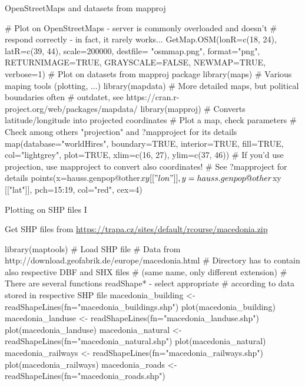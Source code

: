 \documentclass[compress, ucs, xelatex, 11pt, xcolor=svgnames,
  hyperref={
    bookmarks=true,
    unicode=true,
    colorlinks=true,
    pdftitle={Molecular data in R},
    plainpages=false,
    pdfauthor={Vojtech Zeisek},
    pdfsubject={Course about phylogeny and evolution in R},
    pdfcreator={XeLaTeX},
    pdfkeywords={R, evolution, phylogeny, molecular data},
    linkcolor=Tomato,
    anchorcolor=SaddleBrown,
    citecolor=Goldenrod,
    filecolor=DarkMagenta,
    menucolor=Sienna,
    urlcolor=DarkTurquoise,
    pdftex},
  url={hyphens, lowtilde} %
  ]{beamer}
\begin{document}
\begin{frame}[fragile]{OpenStreetMaps and datasets from mapproj}
  \begin{spluscode}
    # Plot on OpenStreetMaps - server is commonly overloaded and doesn't
    # respond correctly - in fact, it rarely works...
    GetMap.OSM(lonR=c(18, 24), latR=c(39, 44), scale=200000, destfile=
      "osmmap.png", format="png", RETURNIMAGE=TRUE, GRAYSCALE=FALSE,
      NEWMAP=TRUE, verbose=1)
    # Plot on datasets from mapproj package
    library(maps) # Various maping tools (plotting, ...)
    library(mapdata) # More detailed maps, but political boundaries often
          # outdatet, see https://cran.r-project.org/web/packages/mapdata/
    library(mapproj) # Converts latitude/longitude into projected coordinates
    # Plot a map, check parameters
    # Check among others "projection" and ?mapproject for its details
    map(database="worldHires", boundary=TRUE, interior=TRUE, fill=TRUE,
      col="lightgrey", plot=TRUE, xlim=c(16, 27), ylim=c(37, 46))
    # If you'd use projection, use mapproject to convert also coordinates!
    # See ?mapproject for details
    points(x=hauss.genpop@other$xy[["lon"]], y=hauss.genpop@other$xy
      [["lat"]], pch=15:19, col="red", cex=4)
  \end{spluscode}
\end{frame}

\begin{frame}[fragile]{Plotting on SHP files I}
\begin{scriptsize}
  Get SHP files from \url{https://trapa.cz/sites/default/rcourse/macedonia.zip}
\end{scriptsize}
  \begin{spluscode}
    library(maptools)
    # Load SHP file
    # Data from http://download.geofabrik.de/europe/macedonia.html
    # Directory has to contain also respective DBF and SHX files
    # (same name, only different extension)
    # There are several functions readShape* - select appropriate
    # according to data stored in respective SHP file
    macedonia_building <- readShapeLines(fn="macedonia_buildings.shp")
    plot(macedonia_building)
    macedonia_landuse <- readShapeLines(fn="macedonia_landuse.shp")
    plot(macedonia_landuse)
    macedonia_natural <- readShapeLines(fn="macedonia_natural.shp")
    plot(macedonia_natural)
    macedonia_railways <- readShapeLines(fn="macedonia_railways.shp")
    plot(macedonia_railways)
    macedonia_roads <- readShapeLines(fn="macedonia_roads.shp")
  \end{spluscode}
\end{frame}
\end{document}
